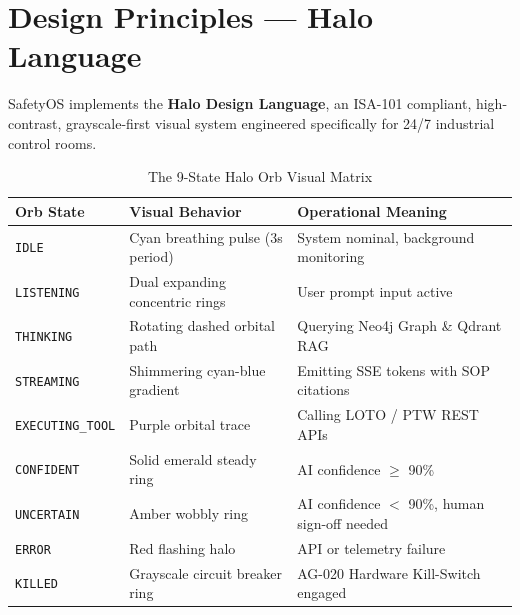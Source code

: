 \documentclass[11pt,a4paper]{article}
\begin{document}
\section{Design Principles — Halo Language}
SafetyOS implements the \textbf{Halo Design Language}, an ISA-101 compliant, high-contrast, grayscale-first visual system engineered specifically for 24/7 industrial control rooms.

\begin{table}[htbp]
\centering
\caption{The 9-State Halo Orb Visual Matrix}
\begin{tabularx}{\textwidth}{
>{\ttfamily\raggedright\arraybackslash}p{}
>{\raggedright\arraybackslash}X
>{\raggedright\arraybackslash}X
}
\toprule
\textbf{Orb State} & \textbf{Visual Behavior} & \textbf{Operational Meaning} \\
\midrule
\texttt{IDLE} & Cyan breathing pulse (3s period) & System nominal, background monitoring \\
\texttt{LISTENING} & Dual expanding concentric rings & User prompt input active \\
\texttt{THINKING} & Rotating dashed orbital path & Querying Neo4j Graph \& Qdrant RAG \\
\texttt{STREAMING} & Shimmering cyan-blue gradient & Emitting SSE tokens with SOP citations \\
\texttt{EXECUTING\_TOOL} & Purple orbital trace & Calling LOTO / PTW REST APIs \\
\texttt{CONFIDENT} & Solid emerald steady ring & AI confidence $\ge$ 90\% \\
\texttt{UNCERTAIN} & Amber wobbly ring & AI confidence $<$ 90\%, human sign-off needed \\
\texttt{ERROR} & Red flashing halo & API or telemetry failure \\
\texttt{KILLED} & Grayscale circuit breaker ring & AG-020 Hardware Kill-Switch engaged \\
\bottomrule
\end{tabularx}
\end{table}
\end{document}
